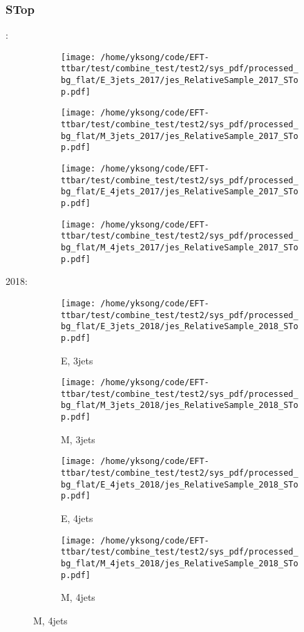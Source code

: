 \documentclass{beamer}
\begin{document}
\begin{frame}
\frametitle{STop}
\fontsize{5}{1}:
\begin{figure}
\centering
\begin{subfigure}[b]{0.24\textwidth}
\texttt{[image: /home/yksong/code/EFT-ttbar/test/combine\_test/test2/sys\_pdf/processed\_bg\_flat/E\_3jets\_2017/jes\_RelativeSample\_2017\_STop.pdf]}
\end{subfigure}
\begin{subfigure}[b]{0.24\textwidth}
\texttt{[image: /home/yksong/code/EFT-ttbar/test/combine\_test/test2/sys\_pdf/processed\_bg\_flat/M\_3jets\_2017/jes\_RelativeSample\_2017\_STop.pdf]}
\end{subfigure}
\begin{subfigure}[b]{0.24\textwidth}
\texttt{[image: /home/yksong/code/EFT-ttbar/test/combine\_test/test2/sys\_pdf/processed\_bg\_flat/E\_4jets\_2017/jes\_RelativeSample\_2017\_STop.pdf]}
\end{subfigure}
\begin{subfigure}[b]{0.24\textwidth}
\texttt{[image: /home/yksong/code/EFT-ttbar/test/combine\_test/test2/sys\_pdf/processed\_bg\_flat/M\_4jets\_2017/jes\_RelativeSample\_2017\_STop.pdf]}
\end{subfigure}
\end{figure}
2018:
\begin{figure}
\centering
\begin{subfigure}[b]{0.24\textwidth}
\texttt{[image: /home/yksong/code/EFT-ttbar/test/combine\_test/test2/sys\_pdf/processed\_bg\_flat/E\_3jets\_2018/jes\_RelativeSample\_2018\_STop.pdf]}
\captionsetup{font=tiny}
\caption{E, 3jets}
\end{subfigure}
\begin{subfigure}[b]{0.24\textwidth}
\texttt{[image: /home/yksong/code/EFT-ttbar/test/combine\_test/test2/sys\_pdf/processed\_bg\_flat/M\_3jets\_2018/jes\_RelativeSample\_2018\_STop.pdf]}
\captionsetup{font=tiny}
\caption{M, 3jets}
\end{subfigure}
\begin{subfigure}[b]{0.24\textwidth}
\texttt{[image: /home/yksong/code/EFT-ttbar/test/combine\_test/test2/sys\_pdf/processed\_bg\_flat/E\_4jets\_2018/jes\_RelativeSample\_2018\_STop.pdf]}
\captionsetup{font=tiny}
\caption{E, 4jets}
\end{subfigure}
\begin{subfigure}[b]{0.24\textwidth}
\texttt{[image: /home/yksong/code/EFT-ttbar/test/combine\_test/test2/sys\_pdf/processed\_bg\_flat/M\_4jets\_2018/jes\_RelativeSample\_2018\_STop.pdf]}
\captionsetup{font=tiny}
\caption{M, 4jets}
\end{subfigure}
\end{figure}
\end{frame}
\end{document}

